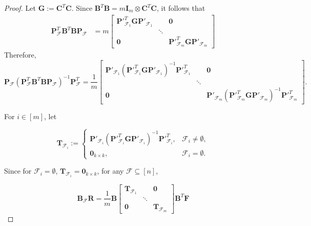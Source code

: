 \documentclass[10pt,a4paper]{amsart}
\newcommand{\bfB}{\mathbf{B}}
\newcommand{\bfC}{\mathbf{C}}
\newcommand{\bfF}{\mathbf{F}}
\newcommand{\bfI}{\mathbf{I}}
\newcommand{\bfR}{\mathbf{R}}
\newcommand{\cF}{\mathcal{F}}
\newcommand{\sifat}[1]{\marginpar{+}{\bf Sifat's remark}: {\em #1}}
\begin{document}
\begin{proof}
Let $\mathbf{G}:=\mathbf{C}^T\mathbf{C}.$ Since $\bfB^T\bfB = m \bfI_m \otimes \bfC^T \bfC$, it follows that
\begin{align*}
\mathbf{P}_{\mathcal{F}}^T\mathbf{B}^T\mathbf{B}
\mathbf{P}_{\mathcal{F}}
& = m
\begin{bmatrix}
\mathbf{P}'^{T}_{\mathcal{F}_1} \mathbf{G}\mathbf{P}'_{\mathcal{F}_1}
& & \mathbf{0}\\
&
\ddots
&\\
\mathbf{0}
& &
\mathbf{P}'^{T}_{\mathcal{F}_m}\mathbf{G}\mathbf{P}'_{\mathcal{F}_m}
\end{bmatrix}
\end{align*}
 Therefore,
\[
\mathbf{P}_{\mathcal{F}}
(\mathbf{P}_{\mathcal{F}}^T\mathbf{B}^T\mathbf{B}
\mathbf{P}_{\mathcal{F}})^{-1}
\mathbf{P}_{\mathcal{F}}^T
=
\frac{1}{m}
\begin{bmatrix}
\mathbf{P}'_{\mathcal{F}_1}
\left(
\mathbf{P}'^{T}_{\mathcal{F}_1}
\mathbf{G}
\mathbf{P}'_{\mathcal{F}_1}
\right)^{-1}
\mathbf{P}'^{T}_{\mathcal{F}_1} & & \mathbf{0}\\
& \ddots &\\
\mathbf{0} & & \mathbf{P}'_{\mathcal{F}_m}
\left(
\mathbf{P}'^{T}_{\mathcal{F}_m}
\mathbf{G}
\mathbf{P}'_{\mathcal{F}_m}
\right)^{-1}
\mathbf{P}'^{T}_{\mathcal{F}_m}
\end{bmatrix}.
\]


For $i\in[m]$, let



\[
\mathbf{T}_{\mathcal{F}_i} :=
\begin{cases}
\mathbf{P}'_{\mathcal{F}_i}
\left(
\mathbf{P}'^{T}_{\mathcal{F}_i}
\mathbf{G}
\mathbf{P}'_{\mathcal{F}_i}
\right)^{-1}
\mathbf{P}'^{T}_{\mathcal{F}_i}, & \mathcal{F}_i \neq \emptyset, \\[0.5em]
\mathbf{0}_{k \times k}, & \mathcal{F}_i = \emptyset.
\end{cases}
\]



Since for $\cF_i = \emptyset$, $\mathbf{T}_{\cF_i} = \mathbf{0}_{k \times k}$, for any $\cF \subseteq [n]$, 

\[\mathbf{B}_{\cF} \bfR = \frac{1}{m}\mathbf{B}\begin{bmatrix}
\mathbf{T}_{\cF_1} & & \mathbf{0}\\
& \ddots &\\
\mathbf{0} & & \mathbf{T}_{\cF_m} 
\end{bmatrix} \bfB^T \bfF\]



\end{proof}
\end{document}

